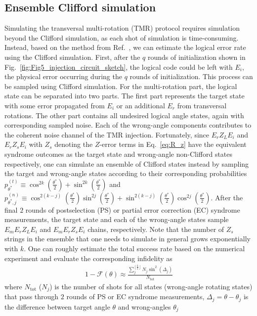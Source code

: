 \documentclass[aps, prx, reprint, superscriptaddress, longbibliography, floatfix]{revtex4-2}
\begin{document}
\subsection{Ensemble Clifford simulation}
\label{sec:fid_est_TMR}
Simulating the transversal multi-rotation (TMR) protocol requires simulation beyond the Clifford simulation, as each shot of simulation is time-consuming. Instead, based on the method from Ref.~\cite{Toshio2024}, we can estimate the logical error rate using the Clifford simulation. First, after the $q$ rounds of initialization shown in Fig.~\ref{fig:Fig5_injection_circuit_sketch}, the logical code could be left with $E_i$, the physical error occurring during the $q$ rounds of initialization. This process can be sampled using Clifford simulation. For the multi-rotation part, the logical state can be separated into two parts. The first part represents the target state with some error propagated from $E_i$ or an additional $E_r$ from transversal rotations. The other part contains all undesired logical angle states, again with corresponding sampled noise. Each of the wrong-angle components contributes to the coherent noise channel of the TMR injection. Fortunately, since $E_r Z_L E_i$ and $E_r Z_s E_i$ with $Z_s$ denoting the $Z$-error terms in Eq.~\eqref{eq:R_z} have the equivalent syndrome outcomes as the target state and wrong-angle non-Clifford states respectively, one can simulate an ensemble of Clifford states instead by sampling the target and wrong-angle states according to their corresponding probabilities $p^{(t)}_{\theta^*}\equiv \cos^{2k}(\frac{\theta^*}{2})+\sin^{2k}(\frac{\theta^*}{2})$ and $p^{(n)}_{\theta^*,j}\equiv\cos^{2(k-j)}(\frac{\theta^*}{2})\sin^{2j}(\frac{\theta^*}{2})+\sin^{2(k-j)}(\frac{\theta^*}{2})\cos^{2j}(\frac{\theta^*}{2})$. 
After the final $2$ rounds of postselection (PS) or partial error correction (EC) syndrome measurements, the target state and each of the wrong-angle states sample $E_m E_r Z_L E_i$ and $E_mE_r Z_s E_i$ chains, respectively. Note that the number of $Z_s$ strings in the ensemble that one needs to simulate in general grows exponentially with $k$. One can roughly estimate the total success rate based on the numerical experiment and evaluate the corresponding infidelity as
\begin{align}
\label{eq: inf_o}
     1-\mathcal{F}(\theta) \approx \frac{\sum_j^{\left \lfloor\frac{k}{2}\right \rfloor}N_{j}\sin^2\left ( \Delta_j \right )}{N_\text{tot}}
\end{align}
where $N_{\text{tot}}$ ($N_j$) is the number of shots for all states (wrong-angle rotating states) that pass through $2$ rounds of PS or EC syndrome measurements, $\Delta_j=\theta-\theta_j$ is the difference between target angle $\theta$ and wrong-angles $\theta_j$
\end{document}
